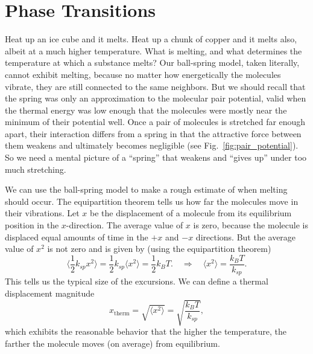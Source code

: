\section{Phase Transitions}
\label{sec:phase_transitions}

Heat up an ice cube and it melts.  Heat up a chunk of copper and it
melts also, albeit at a much higher temperature.  What is melting, and
what determines the temperature at which a substance melts?  Our
ball-spring model, taken literally, cannot exhibit melting, because no
matter how energetically the molecules vibrate, they are still
connected to the same neighbors.  But we should recall that the spring
was only an approximation to the molecular pair potential, valid when
the thermal energy was low enough that the molecules were mostly near
the minimum of their potential well.  Once a pair of molecules is
stretched far enough apart, their interaction differs from a spring in
that the attractive force between them weakens and ultimately becomes
negligible (see Fig.~\ref{fig:pair_potential}).  So we need a mental
picture of a ``spring'' that weakens and ``gives up'' under too much
stretching.

We can use the ball-spring model to make a rough estimate of when
melting should occur.  The equipartition theorem tells us how far the
molecules move in their vibrations.  Let $x$ be the displacement
of a molecule from its equilibrium position in the $x$-direction.  The
average value of $x$ is zero, because the molecule is displaced equal
amounts of time in the $+x$ and $-x$ directions.  But the
average value of $x^2$ is not zero and is given by (using the
equipartition theorem)
\begin{equation}
\bigl\langle{\textstyle\frac{1}{2}}k_{sp}{x^2}\bigr\rangle =
{\textstyle\frac{1}{2}}k_{sp}\langle{x^2}\rangle 
= {\textstyle\frac{1}{2}}k_BT.
\quad\Rightarrow\quad
\langle x^2\rangle = \frac{k_BT}{k_{sp}}.
\end{equation}
This tells us the typical size of the excursions.  We can define a
thermal displacement magnitude
\begin{equation}
x_\text{therm} = \sqrt{\langle x^2\rangle} = \sqrt{\frac{k_BT}{k_{sp}}},
\label{eq:x_thermal}
\end{equation}
which exhibits the reasonable behavior that the higher the temperature,
the farther the molecule moves (on average) from equilibrium.  

